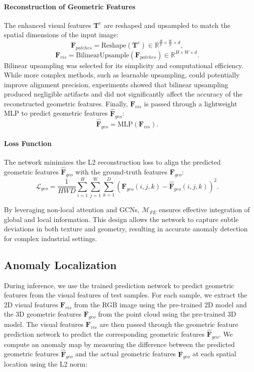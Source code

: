 \paragraph*{Reconstruction of Geometric Features}
The enhanced visual features $\mathbf{T}^e$ are reshaped and upsampled to match the spatial dimensions of the input image:
\[
\mathbf{F}_{patches} = \text{Reshape}(\mathbf{T}^e) \in \mathbb{R}^{\frac{H}{p} \times \frac{W}{p} \times d},
\]
\[
\mathbf{F}_{vis} = \text{BilinearUpsample}(\mathbf{F}_{patches}) \in \mathbb{R}^{H \times W \times d}.
\]
Bilinear upsampling was selected for its simplicity and computational efficiency. While more complex methods, such as learnable upsampling, could potentially improve alignment precision, experiments showed that bilinear upsampling produced negligible artifacts and did not significantly affect the accuracy of the reconstructed geometric features. Finally, $\mathbf{F}_{vis}$ is passed through a lightweight MLP to predict geometric features $\hat{\mathbf{F}}_{geo}$:
\[
\hat{\mathbf{F}}_{geo} = \text{MLP}(\mathbf{F}_{vis}).
\]

\paragraph*{Loss Function}
The network minimizes the L2 reconstruction loss to align the predicted geometric features $\hat{\mathbf{F}}_{geo}$ with the ground-truth features $\mathbf{F}_{geo}$:
\[
\mathcal{L}_{geo} = \frac{1}{HWD} \sum_{i=1}^{H} \sum_{j=1}^{W} \sum_{k=1}^{D} \left( \mathbf{F}_{geo}(i, j, k) - \hat{\mathbf{F}}_{geo}(i, j, k) \right)^2.
\]

By leveraging non-local attention and GCNs, $\mathcal{M}_{FE}$ ensures effective integration of global and local information. This design allows the network to capture subtle deviations in both texture and geometry, resulting in accurate anomaly detection for complex industrial settings.


\subsection*{Anomaly Localization}

During inference, we use the trained prediction network to predict geometric features from the visual features of test samples. For each sample, we extract the 2D visual features $\mathbf{F}_{vis}$ from the RGB image using the pre-trained 2D model and the 3D geometric features $\mathbf{F}_{geo}$ from the point cloud using the pre-trained 3D model. The visual features $\mathbf{F}_{vis}$ are then passed through the geometric feature prediction network to predict the corresponding geometric features $\hat{\mathbf{F}}_{geo}$. We compute an anomaly map by measuring the difference between the predicted geometric features $\hat{\mathbf{F}}_{geo}$ and the actual geometric features $\mathbf{F}_{geo}$ at each spatial location using the L2 norm:

